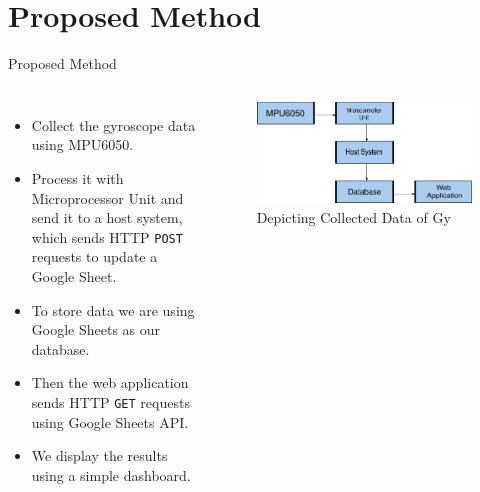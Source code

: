 \documentclass[aspectratio=169,xcolor=dvipsnames]{beamer}
\begin{document}
\section{Proposed Method}

\begin{frame}{Proposed Method}

 \begin{columns}[c]
    \begin{itemize}
        \item Collect the gyroscope data using MPU6050.
        \item Process it with Microprocessor Unit and send it to a host system,
            which sends HTTP \texttt{POST} requests to update a Google Sheet.
        \item To store data we are using Google Sheets as our database.
        \item Then the web application sends HTTP \texttt{GET} requests using
            Google Sheets API.
        \item We display the results using a simple dashboard.
    \end{itemize}
    \begin{figure}
        \centering
            \includegraphics[scale=0.2]{flowchart.pdf}
            \caption{Depicting Collected Data of Gy}
            \label{fig:archi}
        \end{figure}
     \end{columns}
\end{frame}

\end{document}
